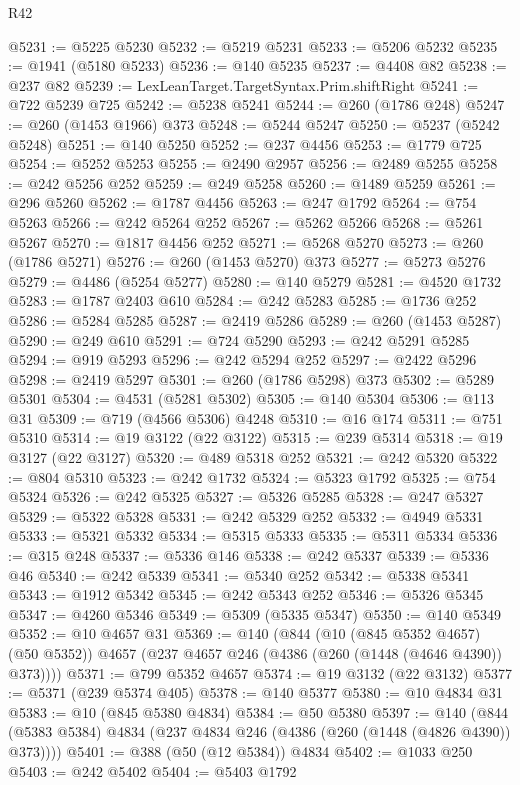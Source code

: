 \begin{lexlean}{R42}
\begin{coremodule}
{@5231 := @5225 @5230
@5232 := @5219 @5231
@5233 := @5206 @5232
@5235 := @1941 (@5180 @5233)
@5236 := @140 @5235
@5237 := @4408 @82
@5238 := @237 @82
@5239 := LexLeanTarget.TargetSyntax.Prim.shiftRight
@5241 := @722 @5239 @725
@5242 := @5238 @5241
@5244 := @260 (@1786 @248)
@5247 := @260 (@1453 @1966) @373
@5248 := @5244 @5247
@5250 := @5237 (@5242 @5248)
@5251 := @140 @5250
@5252 := @237 @4456
@5253 := @1779 @725
@5254 := @5252 @5253
@5255 := @2490 @2957
@5256 := @2489 @5255
@5258 := @242 @5256 @252
@5259 := @249 @5258
@5260 := @1489 @5259
@5261 := @296 @5260
@5262 := @1787 @4456
@5263 := @247 @1792
@5264 := @754 @5263
@5266 := @242 @5264 @252
@5267 := @5262 @5266
@5268 := @5261 @5267
@5270 := @1817 @4456 @252
@5271 := @5268 @5270
@5273 := @260 (@1786 @5271)
@5276 := @260 (@1453 @5270) @373
@5277 := @5273 @5276
@5279 := @4486 (@5254 @5277)
@5280 := @140 @5279
@5281 := @4520 @1732
@5283 := @1787 @2403 @610
@5284 := @242 @5283
@5285 := @1736 @252
@5286 := @5284 @5285
@5287 := @2419 @5286
@5289 := @260 (@1453 @5287)
@5290 := @249 @610
@5291 := @724 @5290
@5293 := @242 @5291 @5285
@5294 := @919 @5293
@5296 := @242 @5294 @252
@5297 := @2422 @5296
@5298 := @2419 @5297
@5301 := @260 (@1786 @5298) @373
@5302 := @5289 @5301
@5304 := @4531 (@5281 @5302)
@5305 := @140 @5304
@5306 := @113 @31
@5309 := @719 (@4566 @5306) @4248
@5310 := @16 @174
@5311 := @751 @5310
@5314 := @19 @3122 (@22 @3122)
@5315 := @239 @5314
@5318 := @19 @3127 (@22 @3127)
@5320 := @489 @5318 @252
@5321 := @242 @5320
@5322 := @804 @5310
@5323 := @242 @1732
@5324 := @5323 @1792
@5325 := @754 @5324
@5326 := @242 @5325
@5327 := @5326 @5285
@5328 := @247 @5327
@5329 := @5322 @5328
@5331 := @242 @5329 @252
@5332 := @4949 @5331
@5333 := @5321 @5332
@5334 := @5315 @5333
@5335 := @5311 @5334
@5336 := @315 @248
@5337 := @5336 @146
@5338 := @242 @5337
@5339 := @5336 @46
@5340 := @242 @5339
@5341 := @5340 @252
@5342 := @5338 @5341
@5343 := @1912 @5342
@5345 := @242 @5343 @252
@5346 := @5326 @5345
@5347 := @4260 @5346
@5349 := @5309 (@5335 @5347)
@5350 := @140 @5349
@5352 := @10 @4657 @31
@5369 := @140
    (@844
      (@10 (@845 @5352 @4657) (@50 @5352))
      @4657
      (@237 @4657 @246 (@4386 (@260 (@1448 (@4646 @4390)) @373))))
@5371 := @799 @5352 @4657
@5374 := @19 @3132 (@22 @3132)
@5377 := @5371 (@239 @5374 @405)
@5378 := @140 @5377
@5380 := @10 @4834 @31
@5383 := @10 (@845 @5380 @4834)
@5384 := @50 @5380
@5397 := @140 (@844 (@5383 @5384) @4834 (@237 @4834 @246 (@4386 (@260 (@1448 (@4826 @4390)) @373))))
@5401 := @388 (@50 (@12 @5384)) @4834
@5402 := @1033 @250
@5403 := @242 @5402
@5404 := @5403 @1792
}
\end{coremodule}
\end{lexlean}
